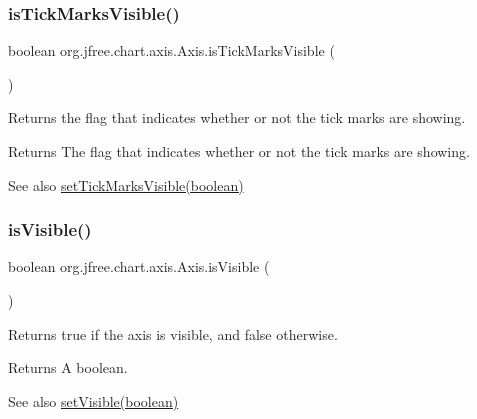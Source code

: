 \subsubsection{\texorpdfstring{is\+Tick\+Marks\+Visible()}{isTickMarksVisible()}}
{\footnotesize\ttfamily boolean org.\+jfree.\+chart.\+axis.\+Axis.\+is\+Tick\+Marks\+Visible (\begin{DoxyParamCaption}{ }\end{DoxyParamCaption})}

Returns the flag that indicates whether or not the tick marks are showing.

\begin{DoxyReturn}{Returns}
The flag that indicates whether or not the tick marks are showing.
\end{DoxyReturn}
\begin{DoxySeeAlso}{See also}
\mbox{\hyperlink{classorg_1_1jfree_1_1chart_1_1axis_1_1_axis_ae042728f9c85c4614720a84df73b50bb}{set\+Tick\+Marks\+Visible(boolean)}} 
\end{DoxySeeAlso}
\mbox{\label{classorg_1_1jfree_1_1chart_1_1axis_1_1_axis_ab40987e53712a299b588e23effa22f90}} 
\subsubsection{\texorpdfstring{is\+Visible()}{isVisible()}}
{\footnotesize\ttfamily boolean org.\+jfree.\+chart.\+axis.\+Axis.\+is\+Visible (\begin{DoxyParamCaption}{ }\end{DoxyParamCaption})}

Returns {\ttfamily true} if the axis is visible, and {\ttfamily false} otherwise.

\begin{DoxyReturn}{Returns}
A boolean.
\end{DoxyReturn}
\begin{DoxySeeAlso}{See also}
\mbox{\hyperlink{classorg_1_1jfree_1_1chart_1_1axis_1_1_axis_aa76bd373dd5f03f842bbef81e65c2eba}{set\+Visible(boolean)}} 
\end{DoxySeeAlso}
\mbox{\label{classorg_1_1jfree_1_1chart_1_1axis_1_1_axis_ae8b4ab3f80703d05433657810338ea50}} 

